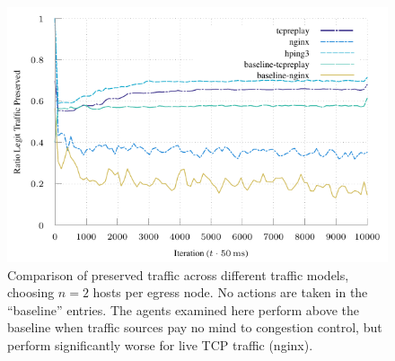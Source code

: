 \documentclass[conference, letterpaper, 10pt, times]{IEEEtran}
\begin{document}

\begin{figure}
	\includegraphics[width=\linewidth]{../plots/online-varyN-nginx}
	\caption{
		Comparison of preserved traffic across different traffic models, choosing $n=2$ hosts per egress node.
		No actions are taken in the ``baseline'' entries.
		The agents examined here perform above the baseline when traffic sources pay no mind to congestion control, but perform significantly worse for live TCP traffic (nginx).
		\label{fig:nginx-coffin-nail}
	}
\end{figure}
\end{document}
